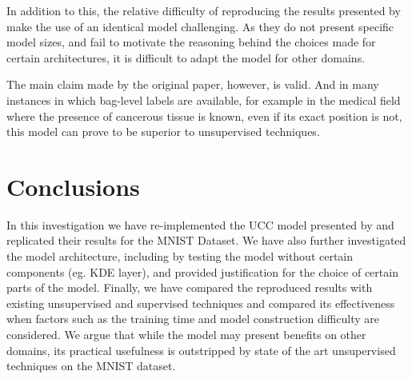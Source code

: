 \documentclass{article} %
\begin{document}
In addition to this, the relative difficulty of reproducing the results presented by \cite{Oner2019} make the use of an identical model challenging. As they do not present specific model sizes, and fail to motivate the reasoning behind the choices made for certain architectures, it is difficult to adapt the model for other domains.

The main claim made by the original paper, however, is valid. And in many instances in which bag-level labels are available, for example in the medical field where the presence of cancerous tissue is known, even if its exact position is not, this model can prove to be superior to unsupervised techniques.

\section{Conclusions}
In this investigation we have re-implemented the UCC model presented by \cite{Oner2019} and replicated their results for the MNIST Dataset. We have also further investigated the model architecture, including by testing the model without certain components (eg. KDE layer), and provided justification for the choice of certain parts of the model. Finally, we have compared the reproduced results with existing unsupervised and supervised techniques and compared its effectiveness when factors such as the training time and model construction difficulty are considered. We argue that while the model may present benefits on other domains, its practical usefulness is outstripped by state of the art unsupervised techniques on the MNIST dataset.



\end{document}
